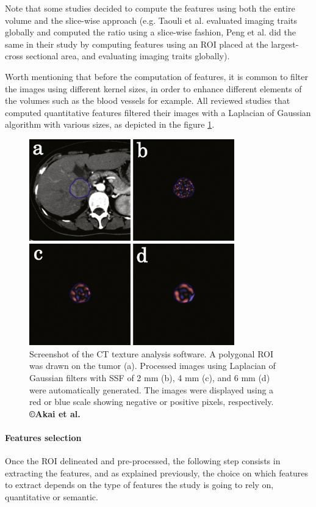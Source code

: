 \documentclass[]{article}
\let\oldparagraph\paragraph
\renewcommand{\paragraph}[1]{\oldparagraph{#1}\mbox{}}
\begin{document}
Note that some studies decided to compute the features using both the
entire volume and the slice-wise approach (e.g. Taouli et al.
evaluated imaging traits globally and computed the ratio using a
slice-wise fashion, Peng et al. did the same in their study by
computing features using an ROI placed at the largest-cross sectional
area, and evaluating imaging traits globally).

Worth mentioning that before the computation of features, it is common
to filter the images using different kernel sizes, in order to enhance
different elements of the volumes such as the blood vessels for example.
All reviewed studies that computed quantitative features filtered their
images with a Laplacian of Gaussian algorithm with various sizes, as
depicted in the figure \ref{AkaiFig_Roi}.

\begin{figure}[ht!]
\centering
\includegraphics[width=3.50110in,height=3.51334in]{./images/image15.png}
\caption{ Screenshot of the CT texture analysis software. A polygonal ROI was
drawn on the tumor (a). Processed images using Laplacian of Gaussian
filters with SSF of 2 mm (b), 4 mm (c), and 6 mm (d) were automatically
generated. The images were displayed using a red or blue scale showing
negative or positive pixels, respectively. \textbf{©Akai et al.} \cite{Akai2018}}
\label{AkaiFig_Roi}
\end{figure}

\paragraph{Features selection}\label{features-selection-1}

Once the ROI delineated and pre-processed, the following step consists
in extracting the features, and as explained previously, the choice on
which features to extract depends on the type of features the study is
going to rely on, quantitative or semantic.
\end{document}
